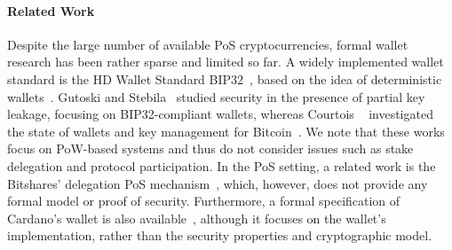 \paragraph{Related Work}
Despite the large number of available PoS cryptocurrencies, formal wallet
research has been rather sparse and limited so far. A widely implemented wallet
standard is the HD Wallet Standard BIP32~\cite{bip32}, based on the idea of
deterministic wallets~\cite{detwallet}. Gutoski and Stebila~\cite{FC:GutSte15}
studied security in the presence of partial key leakage, focusing on
BIP32-compliant wallets, whereas Courtois \etal~\cite{EPRINT:CouEmiVal14}
investigated the state of wallets and key management for
Bitcoin~\cite{nakamoto2008bitcoin}. We note that these works focus on PoW-based
systems and thus do not consider issues such as stake delegation and protocol
participation. In the PoS setting, a related work is the Bitshares' delegation
PoS mechanism~\cite{schuh2017bitshares}, which, however, does not provide any
formal model or proof of security. Furthermore, a formal specification of
Cardano's wallet is also available~\cite{cardano-wallet}, although it focuses
on the wallet's implementation, rather than the security properties and
cryptographic model.
